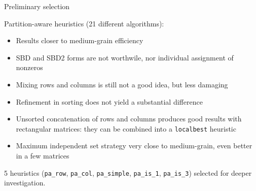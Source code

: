 \begin{frame}{Preliminary selection}

	Partition-aware heuristics (21 different algorithms):

	\begin{itemize}
		\item Results closer to medium-grain efficiency
		\item SBD and SBD2 forms are not worthwile, nor individual assignment of nonzeros
		\item Mixing rows and columns is still not a good idea, but less damaging
		\item Refinement in sorting does not yield a substantial difference
		\item Unsorted concatenation of rows and columns produces good results with rectangular matrices: they can be combined into a \texttt{localbest} heuristic
		\item Maximum independent set strategy very close to medium-grain, even better in a few matrices
	\end{itemize}

	5 heuristics (\texttt{pa\_row}, \texttt{pa\_col}, \texttt{pa\_simple}, \texttt{pa\_is\_1}, \texttt{pa\_is\_3}) selected for deeper investigation.

\end{frame}

